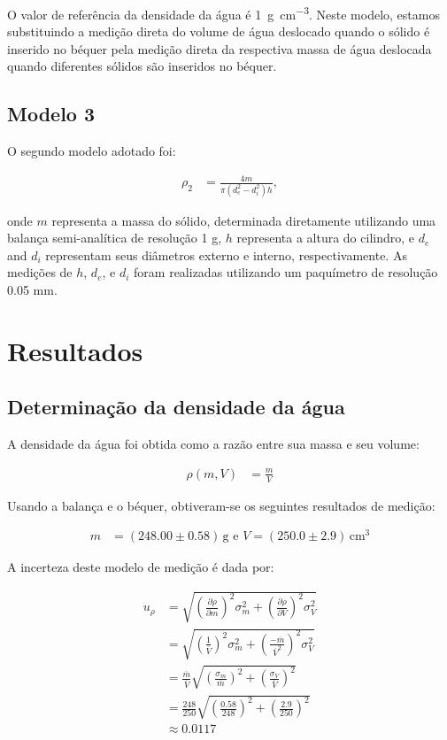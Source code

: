 \documentclass{article}
\begin{document}
\begin{multicols}{2}
O valor de referência da densidade da água é \SI{1}{\gram\per\centi\meter\cubed}. Neste modelo, estamos substituindo a medição direta do volume de água deslocado quando o sólido é inserido no béquer pela medição direta da respectiva massa de água deslocada quando diferentes sólidos são inseridos no béquer.

\subsection{Modelo 3}
O segundo modelo adotado foi:

\begin{align}
\rho_2 &= \frac{4m}{\pi(d_e^2 - d_i^2)h},
\end{align}

onde $m$ representa a massa do sólido, determinada diretamente utilizando uma balança semi-analítica de resolução 1 g, $h$ representa a altura do cilindro, e $d_e$ and $d_i$ representam seus diâmetros externo e interno, respectivamente. As medições de $h$, $d_e$, e $d_i$ foram realizadas utilizando um paquímetro de resolução 0.05 mm.

\section{Resultados}

\subsection{Determinação da densidade da água}
A densidade da água foi obtida como a razão entre sua massa e seu volume:

\begin{align}
\rho(m, V) &= \frac{m}{V}
\end{align}

Usando a balança e o béquer, obtiveram-se os seguintes resultados de medição:

\begin{align}
m &= (248.00 \pm 0.58) \, \text{g e } V = (250.0 \pm 2.9) \, \text{cm}^3
\end{align}

A incerteza deste modelo de medição é dada por:

\begin{align}
u_{\rho} &= \sqrt{\left(\frac{\partial \rho}{\partial m}\right)^2 \sigma^2_m + \left(\frac{\partial \rho}{\partial V}\right)^2 \sigma^2_V} \\
&= \sqrt{\left(\frac{1}{\overline{V}}\right)^2 \sigma^2_m + \left(\frac{-\overline{m}}{\overline{V}^2}\right)^2 \sigma^2_V} \nonumber \\
&= \frac{\overline{m}}{\overline{V}} \sqrt{\left(\frac{\sigma_m}{\overline{m}}\right)^2 + \left(\frac{\sigma_V}{\overline{V}}\right)^2} \nonumber \\
&= \frac{248}{250} \sqrt{\left(\frac{0.58}{248}\right)^2 + \left(\frac{2.9}{250}\right)^2} \nonumber \\
&\approx 0.0117 \nonumber
\end{align}


\end{multicols}
\end{document}
